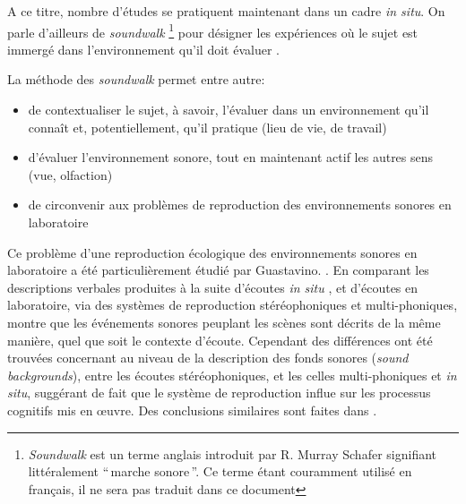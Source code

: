 A ce titre, nombre d'études se pratiquent maintenant  dans un cadre \emph{in situ}. On parle d'ailleurs de \emph{soundwalk}  \footnote{\emph{Soundwalk} est un terme anglais introduit par R. Murray Schafer \citep{schafer1969new} signifiant littéralement ``\,marche sonore\,''. Ce terme étant couramment utilisé en français, il ne sera pas traduit dans ce document} pour désigner les expériences où le sujet est immergé dans l'environnement qu'il doit évaluer \citep{adams2008soundwalking,jeon2013soundwalk}.

La méthode des \emph{soundwalk} permet entre autre:

\begin{itemize}
\item  de contextualiser le sujet, à savoir, l'évaluer dans un environnement qu'il connaît et, potentiellement, qu'il pratique (lieu de vie, de travail)
\item d'évaluer l'environnement sonore, tout en maintenant actif les autres sens (vue, olfaction)
\item de circonvenir aux problèmes de reproduction des environnements sonores en laboratoire
\end{itemize}

Ce problème d'une reproduction écologique des environnements sonores en laboratoire a été particulièrement étudié par Guastavino. \citep{guastavino2003approche,guastavino2004perceptual,guastavino2005ecological}. En comparant les descriptions verbales produites à la suite d'écoutes \emph{in situ} , et d'écoutes en laboratoire, via des systèmes de reproduction stéréophoniques et multi-phoniques, \citep{guastavino2005ecological} montre que les événements sonores peuplant les scènes sont décrits de la même manière, quel que soit le contexte d'écoute. Cependant des différences ont été trouvées concernant  au niveau de la description des fonds sonores (\emph{sound backgrounds}), entre les écoutes stéréophoniques, et les celles multi-phoniques et \emph{in situ}, suggérant de fait que le système de reproduction influe sur les processus cognitifs mis en œuvre. Des conclusions similaires sont faites dans \citep{guastavino2004perceptual}  .

